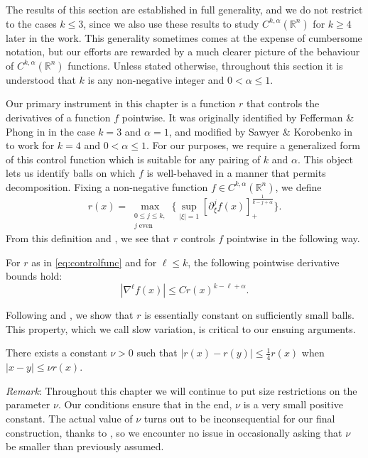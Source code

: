 \documentclass[oneside,hidelinks,indentfirst,10pt]{book}
\begin{document}
The results of this section are established in full generality, and we do not restrict to the cases \(k\leq 3\), since we also use these results to study \(C^{k,\alpha}(\mathbb{R}^n)\) for \(k\geq 4\) later in the work. This generality sometimes comes at the expense of cumbersome notation, but our efforts are rewarded by a much clearer picture of the behaviour of \(C^{k,\alpha}(\mathbb{R}^n)\) functions. Unless stated  otherwise, throughout this section it is understood that \(k\) is any non-negative integer and \(0<\alpha\leq 1\).


Our primary instrument in this chapter is a function \(r\) that controls the derivatives of a function \(f\) pointwise. It was originally identified by Fefferman \& Phong in \cite{Fefferman-Phong} in the case \(k=3\) and \(\alpha=1\), and modified by Sawyer \& Korobenko in \cite{SOS_I} to work for \(k=4\) and \(0<\alpha\leq1\). For our purposes, we require a generalized form of this control function which is suitable for any pairing of \(k\) and \(\alpha\). This object lets us identify balls on which \(f\) is well-behaved in a manner that permits decomposition. Fixing a non-negative function \(f\in C^{k,\alpha}(\mathbb{R}^n)\), we define
\begin{equation}\label{eq:controlfunc}
    r(x)=\max_{\substack{0\leq j\leq k,\\j\;\mathrm{even}}}\bigg\{\sup_{|\xi|=1}[\partial^j_\xi f(x)]_+^\frac{1}{k-j+\alpha}\bigg\}.
\end{equation}
From this definition and , we see that \(r\) controls \(f\) pointwise in the following way.
\begin{cor}\label{cor:controlbound} 
For \(r\)  as in \eqref{eq:controlfunc} and for \(\ell\leq k\), the following pointwise derivative bounds hold:
\[
    |\nabla^\ell f(x)|\leq Cr(x)^{k-\ell+\alpha}.
\]
\end{cor}
Following \cite{Tataru} and \cite{SOS_I}, we show that \(r\) is essentially constant on sufficiently small balls. This property, which we call slow variation, is critical to our ensuing arguments.


\begin{lem}\label{lem:slowvar}
There exists a constant \(\nu>0\) such that \(|r(x)-r(y)|\leq \frac{1}{4}r(x)\) when \(|x-y|\leq \nu r(x)\).
\end{lem}

\textit{Remark}: Throughout this chapter we will continue to put size restrictions on the parameter \(\nu\). Our conditions ensure that in the end, \(\nu\) is a very small positive constant. The actual value of \(\nu\) turns out to be inconsequential for our final construction, thanks to , so we encounter no issue in occasionally asking that \(\nu\) be smaller than previously assumed.
\end{document}
